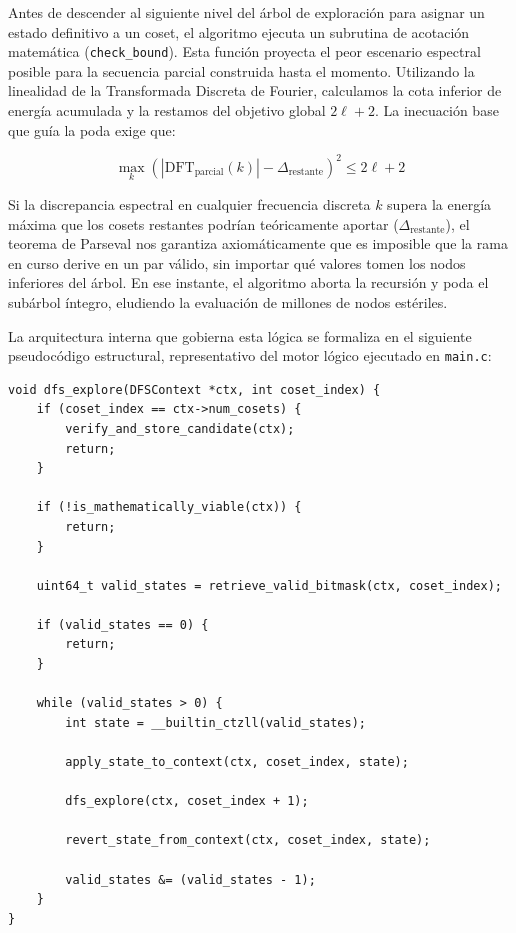\documentclass[12pt,a4paper]{tfg_domingo}
\newcommand{\Comentario}[1]{\textcolor{red}{\textbf{[Comentario:
      #1]}}}
\begin{document}
Antes de descender al siguiente nivel del árbol de exploración para
asignar un estado definitivo a un coset, el algoritmo ejecuta un
subrutina de acotación matemática (\texttt{check\_bound}). Esta
función proyecta el peor escenario espectral posible para la secuencia
parcial construida hasta el momento. Utilizando la linealidad de la
Transformada Discreta de Fourier, calculamos la cota inferior de
energía acumulada y la restamos del objetivo global $2\ell + 2$. La
inecuación base que guía la poda exige que: 


$$ \max_{k} \left( | \text{DFT}_{\text{parcial}}(k) | - \Delta_{\text{restante}} \right)^2 \le 2\ell + 2 $$

Si la discrepancia espectral en cualquier frecuencia discreta $k$
supera la energía máxima que los cosets restantes podrían teóricamente
aportar ($\Delta_{\text{restante}}$), el teorema de Parseval nos garantiza
axiomáticamente que es imposible que la rama en curso derive en un par
válido, sin importar qué valores tomen los nodos inferiores del
árbol. En ese instante, el algoritmo aborta la recursión y poda el
subárbol íntegro, eludiendo la evaluación de millones de nodos
estériles. 

La arquitectura interna que gobierna esta lógica se formaliza en el
siguiente pseudocódigo estructural, representativo del motor lógico
ejecutado en \texttt{main.c}: 

\begin{lstlisting}[caption={Algoritmo central de Búsqueda en Profundidad (DFS) con poda dinámica orientada a bits}, label={lst:dfs_pseudocode}]
void dfs_explore(DFSContext *ctx, int coset_index) {
    if (coset_index == ctx->num_cosets) {
        verify_and_store_candidate(ctx);
        return;
    }

    if (!is_mathematically_viable(ctx)) {
        return;
    }

    uint64_t valid_states = retrieve_valid_bitmask(ctx, coset_index);

    if (valid_states == 0) {
        return;
    }

    while (valid_states > 0) {
        int state = __builtin_ctzll(valid_states);
        
        apply_state_to_context(ctx, coset_index, state);
        
        dfs_explore(ctx, coset_index + 1);
        
        revert_state_from_context(ctx, coset_index, state);
        
        valid_states &= (valid_states - 1);
    }
}
\end{lstlisting}
\end{document}
